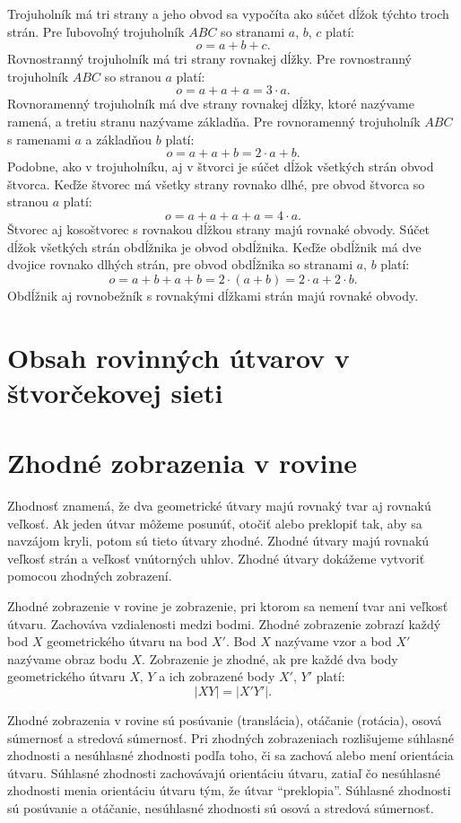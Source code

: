 \documentclass{report}
\begin{document}
Trojuholník má tri strany a jeho obvod sa vypočíta ako súčet dĺžok týchto troch strán. Pre ľubovoľný trojuholník \(ABC\) so stranami \(a\), \(b\), \(c\) platí:
\[
o = a + b + c.
\]
Rovnostranný trojuholník má tri strany rovnakej dĺžky. Pre rovnostranný trojuholník \(ABC\) so stranou \(a\) platí:
\[
o = a + a + a = 3 \cdot a.
\]
Rovnoramenný trojuholník má dve strany rovnakej dĺžky, ktoré nazývame ramená, a tretiu stranu nazývame základňa. Pre rovnoramenný trojuholník \(ABC\) s ramenami \(a\) a základňou \(b\) platí:
\[
o = a + a + b = 2 \cdot a + b.
\]
Podobne, ako v trojuholníku, aj v štvorci je súčet dĺžok všetkých strán obvod štvorca. Keďže štvorec má všetky strany rovnako dlhé, pre obvod štvorca so stranou \(a\) platí:
\[
o = a + a + a + a = 4 \cdot a.
\]
Štvorec aj kosoštvorec s rovnakou dĺžkou strany majú rovnaké obvody.
Súčet dĺžok všetkých strán obdĺžnika je obvod obdĺžnika. Keďže obdĺžnik má dve dvojice rovnako dlhých strán, pre obvod obdĺžnika so stranami \(a\), \(b\) platí:
\[
o = a + b + a + b = 2 \cdot (a + b) = 2 \cdot a + 2 \cdot b.
\]
Obdĺžnik aj rovnobežník s rovnakými dĺžkami strán majú rovnaké obvody.

\section{Obsah rovinných útvarov v štvorčekovej sieti}

\section{Zhodné zobrazenia v rovine}

Zhodnosť znamená, že dva geometrické útvary majú rovnaký tvar aj rovnakú veľkosť. Ak jeden útvar môžeme posunúť, otočiť alebo preklopiť tak, aby sa navzájom kryli, potom sú tieto útvary zhodné. Zhodné útvary majú rovnakú veľkosť strán a veľkosť vnútorných uhlov. Zhodné útvary dokážeme vytvoriť pomocou zhodných zobrazení.

Zhodné zobrazenie v rovine je zobrazenie, pri ktorom sa nemení tvar ani veľkosť útvaru. Zachováva vzdialenosti medzi bodmi. Zhodné zobrazenie zobrazí každý bod \(X\) geometrického útvaru na bod \(X'\). Bod \(X\) nazývame vzor a bod \(X'\) nazývame obraz bodu \(X\). Zobrazenie je zhodné, ak pre každé dva body geometrického útvaru \(X\), \(Y\) a ich zobrazené body \(X'\), \(Y'\) platí:
\[
|XY| = |X'Y'|.
\]

Zhodné zobrazenia v rovine sú posúvanie (translácia), otáčanie (rotácia), osová súmernosť a stredová súmernosť. Pri zhodných zobrazeniach rozlišujeme súhlasné zhodnosti a nesúhlasné zhodnosti podľa toho, či sa zachová alebo mení orientácia útvaru. Súhlasné zhodnosti zachovávajú orientáciu útvaru, zatiaľ čo nesúhlasné zhodnosti menia orientáciu útvaru tým, že útvar \enquote{preklopia}. Súhlasné zhodnosti sú posúvanie a otáčanie, nesúhlasné zhodnosti sú osová a stredová súmernosť.
\end{document}
